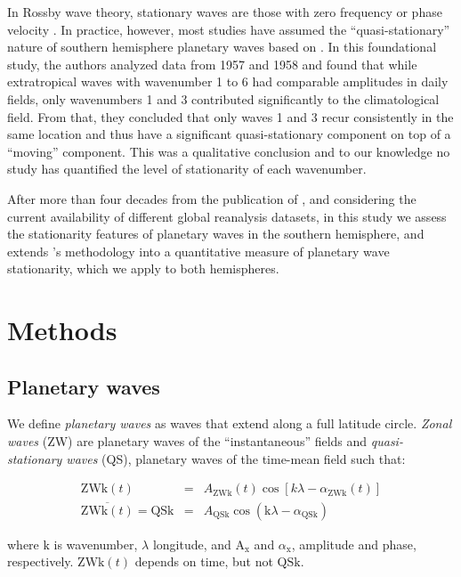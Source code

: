 \documentclass[draft,linenumbers]{agujournal2018}
\begin{document}
In Rossby wave theory, stationary waves are those with zero frequency or
phase velocity \citep{Holton2012a}. In practice, however, most studies
have assumed the ``quasi-stationary'' nature of southern hemisphere
planetary waves based on \citet{Loon1972}. In this foundational study,
the authors analyzed data from 1957 and 1958 and found that while
extratropical waves with wavenumber 1 to 6 had comparable amplitudes in
daily fields, only wavenumbers 1 and 3 contributed significantly to the
climatological field. From that, they concluded that only waves 1 and 3
recur consistently in the same location and thus have a significant
quasi-stationary component on top of a ``moving'' component. This was a
qualitative conclusion and to our knowledge no study has quantified the
level of stationarity of each wavenumber.

After more than four decades from the publication of \citet{Loon1972},
and considering the current availability of different global reanalysis
datasets, in this study we assess the stationarity features of planetary
waves in the southern hemisphere, and extends \citet{Loon1972}'s
methodology into a quantitative measure of planetary wave stationarity,
which we apply to both hemispheres.

\section{Methods}

\subsection{Planetary waves}

We define \emph{planetary waves} as waves that extend along a full
latitude circle. \emph{Zonal waves} (ZW) are planetary waves of the
``instantaneous'' fields and \emph{quasi-stationary waves} (QS),
planetary waves of the time-mean field such that:

\begin{linenomath*}
\begin{eqnarray}\label{eq:ZW}
\mathrm{ZWk}(t) & = & A_\mathrm{ZWk}(t)\cos \left [ k\lambda - \alpha_\mathrm{ZWk}(t) \right ] \\ 
\overline{\mathrm{ZWk}(t)} = \mathrm{QSk} & = & A_\mathrm{QSk}\cos \left (  \mathrm{k}\lambda - \alpha_\mathrm{QSk} \right ) \label{eq:QS}
\end{eqnarray}
\end{linenomath*}

where \(\mathrm{k}\) is wavenumber, \(\lambda\) longitude, and
\(\mathrm{A_{x}}\) and \(\alpha_\mathrm{x}\), amplitude and phase,
respectively. \(\mathrm{ZWk}(t)\) depends on time, but not
\(\mathrm{QSk}\).
\end{document}
